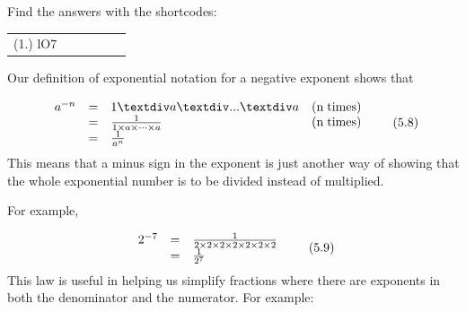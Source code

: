       \label{m38359*uid16}
\par {} Find the answers with the shortcodes:
 \par \begin{tabular}[h]{cccccc}
 (1.) lO7  & \end{tabular}
            \nopagebreak
        \label{m38359*id64482}Our definition of exponential notation for a negative exponent shows that\par 
        \label{m38359*uid17}\nopagebreak\noindent{}
    \begin{equation}
    \begin{array}{cccc}\hfill {a}^{-n}& =& 1÷a÷...÷a\hfill & \left(\mathrm{n\; times}\right)\hfill \\ \hfill & =& \frac{1}{1\ensuremath{\times}a\ensuremath{\times}\cdots \ensuremath{\times}a}\hfill & \left(\mathrm{n\; times}\right)\hfill \\ \hfill & =& \frac{1}{{a}^{n}}\hfill & \end{array}\tag{5.8}
      \end{equation}
        \label{m38359*id64624}This means that a minus sign in the exponent is just another way of showing that the whole exponential number is to be divided instead of multiplied.\par 
        \label{m38359*id64630}For example,\par 
        \label{m38359*id64634}\nopagebreak\noindent{}
          
    \begin{equation}
    \begin{array}{ccc}\hfill {2}^{-7}& =& \frac{1}{2\ensuremath{\times}2\ensuremath{\times}2\ensuremath{\times}2\ensuremath{\times}2\ensuremath{\times}2\ensuremath{\times}2}\hfill \\ & =& \frac{1}{{2}^{7}}\hfill \end{array}\tag{5.9}
      \end{equation}
\label{m38359*eip-294}This law is useful in helping us simplify fractions where there are exponents in both the denominator and the numerator. For example:
\label{m38359*id7902}\nopagebreak\noindent{}


